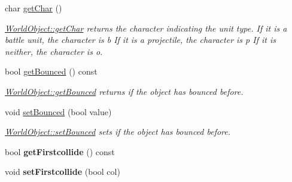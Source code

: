 \begin{DoxyCompactItemize}
\item 
char \hyperlink{class_world_object_a4899b4a491e10707af9df49c6e6b4323}{get\+Char} ()
\begin{DoxyCompactList}\small\item\em \hyperlink{class_world_object_a4899b4a491e10707af9df49c6e6b4323}{World\+Object\+::get\+Char} returns the character indicating the unit type. If it is a battle unit, the character is \textquotesingle{}b\textquotesingle{} If it is a projectile, the character is \textquotesingle{}p\textquotesingle{} If it is neither, the character is \textquotesingle{}o\textquotesingle{}. \end{DoxyCompactList}\item 
bool \hyperlink{class_world_object_ae31450bcd5b77c1dbed862cb55ea6694}{get\+Bounced} () const 
\begin{DoxyCompactList}\small\item\em \hyperlink{class_world_object_ae31450bcd5b77c1dbed862cb55ea6694}{World\+Object\+::get\+Bounced} returns if the object has bounced before. \end{DoxyCompactList}\item 
void \hyperlink{class_world_object_a10f95129b8b184c880412181552f2208}{set\+Bounced} (bool value)
\begin{DoxyCompactList}\small\item\em \hyperlink{class_world_object_a10f95129b8b184c880412181552f2208}{World\+Object\+::set\+Bounced} sets if the object has bounced before. \end{DoxyCompactList}\item 
bool {\bfseries get\+Firstcollide} () const \hypertarget{class_world_object_a34d76ee6f6856829c59793491cab8d45}{}\label{class_world_object_a34d76ee6f6856829c59793491cab8d45}

\item 
void {\bfseries set\+Firstcollide} (bool col)\hypertarget{class_world_object_aa583750fa6789ca354abb88129b3bc2c}{}\label{class_world_object_aa583750fa6789ca354abb88129b3bc2c}

\end{DoxyCompactItemize}
